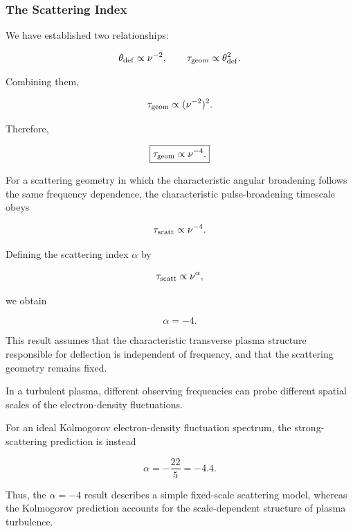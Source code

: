 \subsubsection{The Scattering Index}

We have established two relationships:

\begin{equation}
\theta_{\rm def}\propto\nu^{-2},
\qquad
\tau_{\rm geom}\propto\theta_{\rm def}^2.
\end{equation}

Combining them,

\begin{equation}
\tau_{\rm geom}
\propto
(\nu^{-2})^2.
\end{equation}

Therefore,

\begin{equation}
\boxed{
\tau_{\rm geom}\propto\nu^{-4}.
}
\end{equation}

For a scattering geometry in which the
characteristic angular broadening follows
the same frequency dependence, the
characteristic pulse-broadening timescale
obeys

\begin{equation}
\tau_{\rm scatt}\propto\nu^{-4}.
\end{equation}

Defining the scattering index $\alpha$ by

\begin{equation}
\tau_{\rm scatt}\propto\nu^\alpha,
\end{equation}

we obtain

\begin{equation}
\boxed{\alpha=-4.}
\end{equation}

This result assumes that the characteristic
transverse plasma structure responsible for
deflection is independent of frequency,
and that the scattering geometry remains fixed.

In a turbulent plasma, different observing
frequencies can probe different spatial scales
of the electron-density fluctuations.

For an ideal Kolmogorov electron-density
fluctuation spectrum, the strong-scattering
prediction is instead

\begin{equation}
\boxed{
\alpha=-\frac{22}{5}=-4.4.
}
\end{equation}

Thus, the $\alpha=-4$ result describes
a simple fixed-scale scattering model,
whereas the Kolmogorov prediction accounts
for the scale-dependent structure of
plasma turbulence.

